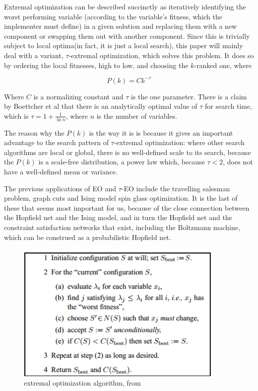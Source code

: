 \documentclass[12pt]{article}
\begin{document}
Extremal optimization can be described succinctly as iteratively identifying the worst performing variable (according to the variable's fitness, which the implementer must define) in a given solution and replacing them with a new component or swapping them out with another component. Since this is trivially subject to local optima(in fact, it is just a local search), this paper will mainly deal with a variant, $\tau$-extremal optimization, which solves this problem. It does so by ordering the local fitnesses, high to low, and choosing the $k$-ranked one, where

$$P(k) = Ck^{-\tau}$$

Where $C$ is a normalizing constant and $\tau$ is the one parameter. There is a claim by Boettcher et al that there is an analytically optimal value of $\tau$ for search time, which is $\tau = 1 + \frac{1}{\ln n}$, where $n$ is the number of variables\cite{boettcher2}.

The reason why the $P(k)$ is the way it is is because it gives an important advantage to the search pattern of $\tau$-extremal optimization: where other search algorithms are local or global, there is no well-defined scale to its search, because the $P(k)$ is a scale-free distribution, a power law which, because $\tau < 2$, does not have a well-defined mean or variance. \cite{mejnewman}

The previous applications of EO and $\tau$-EO include the travelling salesman problem, graph cuts and Ising model spin glass optimization\cite{boettcher2}. It is the last of these that seems most important for us, because of the close connection between the Hopfield net and the Ising model\cite{hopfield}, and in turn the Hopfield net and the constraint satisfaction networks that exist, including the Boltzmann machine, which can be construed as a probabilistic Hopfield net.

\begin{figure}
  \includegraphics[width=4in]{eo_alg}
  \caption{extremal optimization algorithm, from \cite{boettcher}}
\end{figure}
\end{document}
